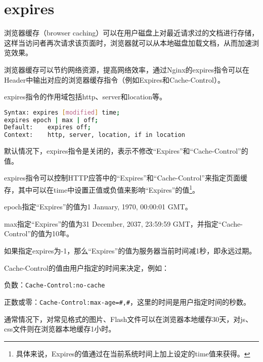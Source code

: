 \begin{lstlisting}[language=bash]

\end{lstlisting}


\section{expires}


浏览器缓存（browser caching）可以在用户磁盘上对最近请求过的文档进行存储，这样当访问者再次请求该页面时，浏览器就可以从本地磁盘加载文档，从而加速浏览效果。

浏览器缓存可以节约网络资源，提高网络效率，通过Nginx的expires指令可以在Header中输出对应的浏览器缓存指令（例如Expires和Cache-Control）。


expires指令的作用域包括http、server和location等。

\begin{lstlisting}[language=bash]
Syntax:	expires [modified] time;
expires epoch | max | off;
Default:	expires off;
Context:	http, server, location, if in location
\end{lstlisting}


默认情况下，expires指令是关闭的，表示不修改“Expires”和“Cache-Control”的值。

expires指令可以控制HTTP应答中的“Expires”和“Cache-Control”来指定页面缓存，其中可以在time中设置正值或负值来影响“Expires”的值\footnote{具体来说，Expires的值通过在当前系统时间上加上设定的time值来获得。}。

\begin{compactitem}
\item epoch指定“Expires”的值为1 January, 1970, 00:00:01 GMT。
\item max指定“Expires”的值为31 December, 2037, 23:59:59 GMT，并指定“Cache-Control”的值为10年。
\end{compactitem}

如果指定expires为-1，那么“Expires”的值为服务器当前时间减1秒，即永远过期。

Cache-Control的值由用户指定的时间来决定，例如：

\begin{compactitem}
\item 负数：\texttt{Cache-Control:no-cache}
\item 正数或零：\texttt{Cache-Control:max-age=\#,\#}，这里的时间是用户指定时间的秒数。
\end{compactitem}

通常情况下，对常见格式的图片、Flash文件可以在浏览器本地缓存30天，对js、css文件则在浏览器本地缓存1小时。

